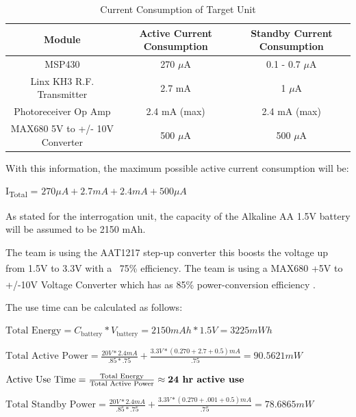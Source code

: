 \documentclass[letterpaper,10pt]{article}
\begin{document}
\begin{spacing}{1.15}
\begin{table}[htbp]
	\centering
	\begin{tabular}{c|c|c}	%
		\toprule	%
		Module & Active Current Consumption & Standby Current Consumption\\
		\midrule
		MSP430 & 270 $\mu$A & 0.1 - 0.7 $\mu$A\\ 
		Linx KH3 R.F. Transmitter & 2.7 mA & 1 $\mu$A\\
		Photoreceiver Op Amp & 2.4 mA (max) & 2.4 mA (max) \\
		MAX680 5V to +/- 10V Converter & 500 $\mu$A  & 500 $\mu$A \\
		\bottomrule	%
	\end{tabular}%
	\caption{Current Consumption of Target Unit}
	\label{tab:table2}	%
\end{table}%

With this information, the maximum possible active current consumption will be:
\begin{center}{I\textsubscript{Total} = $270 \mu A + 2.7 mA + 2.4 mA + 500 \mu A$}\end{center}

As stated for the interrogation unit, the capacity of the Alkaline AA 1.5V battery will be assumed to be 2150 mAh. 

The team is using the AAT1217 step-up converter this boosts the voltage up from 1.5V to 3.3V with a ~75\% efficiency\textsuperscript{\cite{AAT1217}}. The team is using a MAX680 +5V to +/-10V Voltage Converter which has as 85\% power-conversion efficiency \textsuperscript{\cite{MAX680}} . 

The use time can be calculated as follows:

\begin{center} 
	$\textrm{Total Energy} = C_\textrm{battery} * V_\textrm{battery} = 2150 mAh * 1.5V = 3225 mWh$
	
	$\textrm{Total Active Power} = \frac{20V * 2.4 mA}{.85 * .75} + \frac{3.3 V * (0.270 + 2.7 + 0.5) mA}{.75} = 90.5621 mW$
	
	$\textrm{Active Use Time} = \frac{\textrm{Total Energy}}{\textrm{Total Active Power}} \approx \textrm{\textbf{24 hr active use}}$
	
	$\textrm{Total Standby Power} = \frac{20V * 2.4 mA}{.85 * .75} + \frac{3.3 V * (0.270 + .001 + 0.5) mA}{.75} = 78.6865 mW$
	

\end{center}
\end{spacing}
\end{document}
